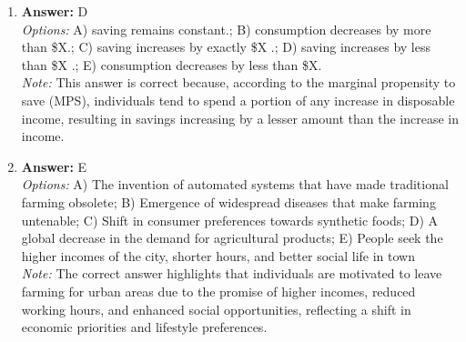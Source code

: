 \documentclass[12pt]{article}
\begin{document}
\begin{enumerate}[label=\arabic*.]
\item \textbf{Answer:} D
\\ \textit{Options:} A) saving remains constant.; B) consumption decreases by more than \$X.; C) saving increases by exactly \$X .; D) saving increases by less than \$X .; E) consumption decreases by less than \$X.
\\ \textit{Note:} This answer is correct because, according to the marginal propensity to save (MPS), individuals tend to spend a portion of any increase in disposable income, resulting in savings increasing by a lesser amount than the increase in income.
\item \textbf{Answer:} E
\\ \textit{Options:} A) The invention of automated systems that have made traditional farming obsolete; B) Emergence of widespread diseases that make farming untenable; C) Shift in consumer preferences towards synthetic foods; D) A global decrease in the demand for agricultural products; E) People seek the higher incomes of the city, shorter hours, and better social life in town
\\ \textit{Note:} The correct answer highlights that individuals are motivated to leave farming for urban areas due to the promise of higher incomes, reduced working hours, and enhanced social opportunities, reflecting a shift in economic priorities and lifestyle preferences.
\end{enumerate}
\end{document}
